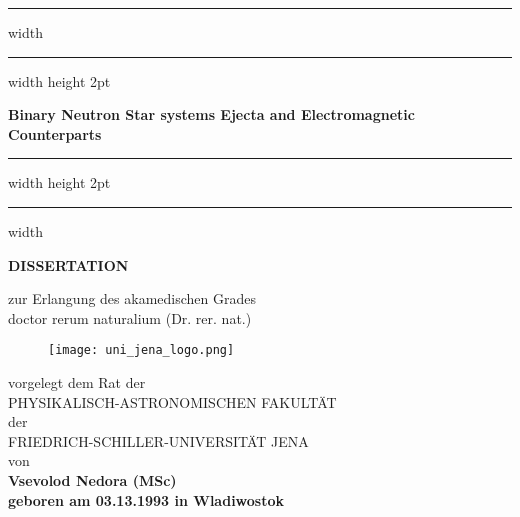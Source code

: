 \documentclass[
openright,
12pt, %
english,%
onehalfspacing, %
nolistspacing, %
nohyperref, %
headsepline, %
]{MastersDoctoralThesis} %
\begin{document}
\frontmatter %
\pagestyle{plain} %


\begin{titlepage}
    
    \begin{center}
        \centering
        {\hrule width \hsize \kern 1mm \hrule width \hsize height 2pt}
        \vspace{5mm}
        \Huge 
        \textbf{Binary Neutron Star systems Ejecta and Electromagnetic Counterparts}
        \vspace{5mm}
        {\hrule width \hsize height 2pt \kern 1mm  \hrule width \hsize }
        
        \vspace{1.5cm}
        
        \LARGE 
        \textbf{DISSERTATION} 
        
        \vspace{0.75cm}
        
        \large
        zur Erlangung des akamedischen Grades\\
        doctor rerum naturalium (Dr. rer. nat.)
        \vspace{0.8cm}
        
        \begin{figure}[!ht]
            \centering
            \texttt{[image: uni\_jena\_logo.png]}
        \end{figure}
        
        \vspace{0.8cm}
        vorgelegt dem Rat der \\
        \vspace{0.3cm}
        PHYSIKALISCH-ASTRONOMISCHEN FAKULT{\"A}T \\
        \vspace{0.3cm}
        der \\
        \vspace{0.3cm}
        FRIEDRICH-SCHILLER-UNIVERSIT{\"A}T JENA \\
        \vspace{0.3cm}
        von \\
        \vspace{0.3cm}
        \bf{Vsevolod Nedora (MSc)} \\
        \vspace{0.3cm}
        geboren am 03.13.1993 in Wladiwostok
        
    \end{center}
    
\end{titlepage}
\end{document}

